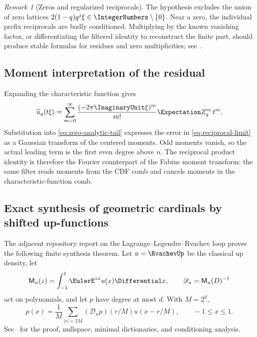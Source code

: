 \documentclass[11pt,a4paper,oneside]{article}
\theoremstyle{definition}
\theoremstyle{remark}
\newtheorem{remark}[remark]{Remark}
\begin{document}
\begin{remark}[Zeros and regularized reciprocals]
The hypothesis excludes the union of zero lattices
$2(1-q)q^j\xi\in\IntegerNumbers\setminus\{0\}$.  Near a zero, the individual prefix
reciprocals are badly conditioned.  Multiplying by the known vanishing factor,
or differentiating the filtered identity to reconstruct the finite part,
should produce stable formulas for residues and zero multiplicities; see
.
\end{remark}

\subsection{Moment interpretation of the residual}

Expanding the characteristic function gives
\begin{equation}
 \widehat u_q(t\xi)
 =\sum_{m=0}^\infty
 \frac{(-2\pi\ImaginaryUnit\xi)^m}{m!}\Expectation Z_q^m\,t^m.
 \label{eq:uq-characteristic-series}
\end{equation}
Substitution into \eqref{eq:zero-analytic-tail} expresses the error in
\eqref{eq:reciprocal-limit} as a Gaussian transform of the centered moments.
Odd moments vanish, so the actual leading term is the first even degree above
$n$.  The reciprocal product identity is therefore the Fourier counterpart of
the Fabius moment transform: the same filter reads moments from the CDF comb
and cancels moments in the characteristic-function comb.

\subsection{Exact synthesis of geometric cardinals by shifted up-functions}
\label{sec:up-synthesis-bridge}

The adjacent repository report on the Lagrange--Legendre--Rvachev loop proves
the following finite synthesis theorem.  Let $u=\RvachevUp$ be the classical up
density, let
\begin{equation}
 \mathsf M_u(z)=\int_{-1}^1\EulerE^{zx}u(x)\Differential x,
 \qquad
 \mathscr D_u=\mathsf M_u(D)^{-1}
 \label{eq:moment-deconvolution}
\end{equation}
act on polynomials, and let $p$ have degree at most $d$.  With $M=2^d$,
\begin{equation}
 p(x)=\frac1M\sum_{|r|<2M}
 (\mathscr D_up)(r/M)u(x-r/M),
 \qquad -1\le x\le1.
 \label{eq:imported-up-synthesis}
\end{equation}
See~\cite{ProveItLagrangeLoop} for the proof, nullspace, minimal dictionaries,
and conditioning analysis.
\end{document}
